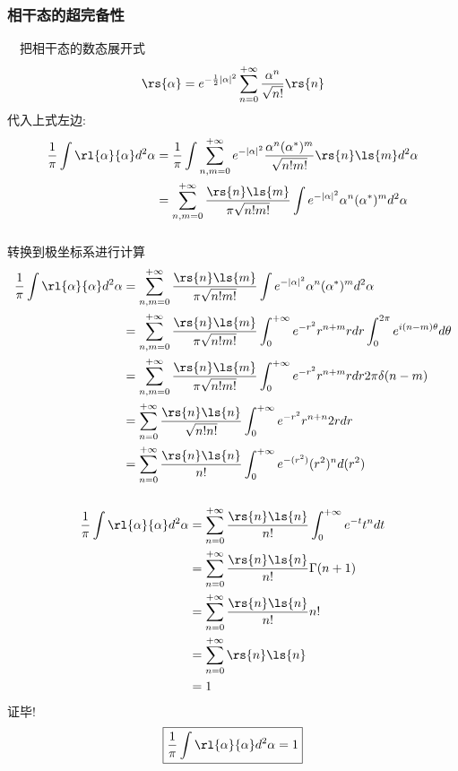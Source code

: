 \begin{frame}
 \frametitle{相干态的超完备性}
 \例[12.试证明相干态具有如下完备性关系]{
    \[ \frac{1}{\pi} \int \rl{\alpha}{\alpha}d ^2 \alpha =1 \] }
 \证 ~ 把相干态的数态展开式
    \[\rs{\alpha} = e^{-\frac{1}{2}\left|\alpha\right|^2}  \sum_{n=0} ^{+\infty}  \frac{\alpha^n}{\sqrt{n!}} \rs{n} \]
 代入上式左边:
 \[
    \begin{aligned}
        \frac{1}{\pi} \int \rl{\alpha}{\alpha}d ^2 \alpha &=  \frac{1}{\pi} \int \sum_{n,m=0} ^{+\infty} e^{-\left|\alpha\right|^2}  
        \frac{\alpha^n(\alpha^*)^m}{\sqrt{n!m!}}  \rs{n}\ls{m }d ^2 \alpha \\
        &= \sum_{n,m=0} ^{+\infty}  \frac{\rs{n}\ls{m }}{\pi \sqrt{ n!m!}}  \int  e^{-\left|\alpha\right|^2}  \alpha^n(\alpha^*)^m  d ^2 \alpha
    \end{aligned}    
 \]    
\end{frame}

\begin{frame}
 \frametitle{}
  转换到极坐标系进行计算
  \[ 
    \begin{aligned}
        \frac{1}{\pi} \int \rl{\alpha}{\alpha}d ^2 \alpha 
        &= \sum_{n,m=0} ^{+\infty}  \frac{\rs{n}\ls{m }}{\pi \sqrt{ n!m!}}  \int  e^{-\left|\alpha\right|^2}  \alpha^n(\alpha^*)^m  d ^2 \alpha \\ 
        &= \sum_{n,m=0} ^{+\infty}  \frac{\rs{n}\ls{m }}{\pi \sqrt{ n!m!}} 
        \int _0 ^ {+\infty}  e^{-r^2}  r^{n+m}  r dr   \int _0 ^ {2 \pi} e^{i(n-m)\theta} d\theta  \\ 
        &= \sum_{n,m=0} ^{+\infty}  \frac{\rs{n}\ls{m }}{\pi \sqrt{ n!m!}} 
        \int _0 ^ {+\infty}  e^{-r^2}  r^{n+m}  r dr   2 \pi \delta(n-m)  \\ 
        &= \sum_{n=0} ^{+\infty}  \frac{\rs{n}\ls{n }}{\sqrt{ n!n!}} 
        \int _0 ^ {+\infty}  e^{-r^2}  r^{n+n}  2r dr  \\ 
        &= \sum_{n=0} ^{+\infty}  \frac{\rs{n}\ls{n }}{n!} 
        \int _0 ^ {+\infty}  e^{-(r^2)}  (r^2)^{n}   d(r^2)  
    \end{aligned}    
 \]        
\end{frame}

\begin{frame}
 \frametitle{}
 \[ 
    \begin{aligned}
        \frac{1}{\pi} \int \rl{\alpha}{\alpha}d ^2 \alpha    
        &= \sum_{n=0} ^{+\infty}  \frac{\rs{n}\ls{n }}{n!} 
        \int _0 ^ {+\infty}  e^{-t}  t^n   dt  \\ 
        &= \sum_{n=0} ^{+\infty}  \frac{\rs{n}\ls{n }}{n!} 
        \Gamma(n+1)  \\ 
        &= \sum_{n=0} ^{+\infty}  \frac{\rs{n}\ls{n }}{n!} 
        n!  \\ 
        &= \sum_{n=0} ^{+\infty}  \rs{n}\ls{n } \\
        &= 1
    \end{aligned}    
 \] 
 证毕!
\[  \boxed{ \frac{1}{\pi} \int \rl{\alpha}{\alpha}d ^2 \alpha =1} \]
\end{frame}

